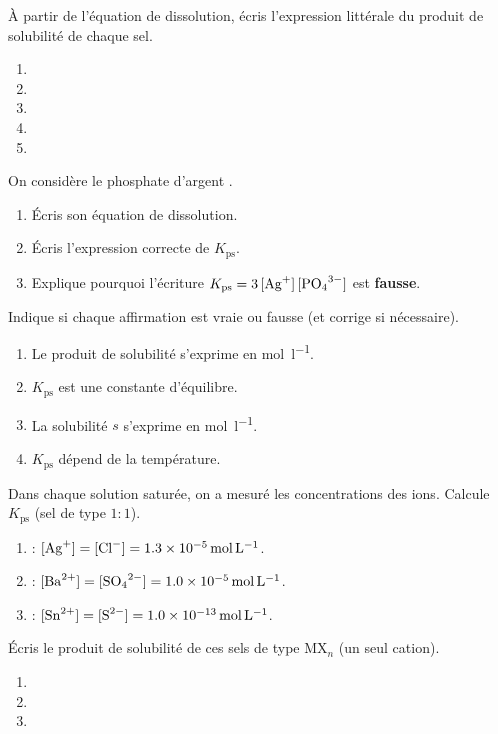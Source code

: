 \documentclass[11pt,a4paper]{article}
\begin{document}
\begin{exo}
À partir de l'équation de dissolution, écris l'expression littérale du produit de solubilité de chaque
sel.
\begin{enumerate}[label=\alph*)]
  \item {}
  \item {}
  \item {}
  \item {}
  \item {}
\end{enumerate}
\end{exo}

\begin{exo}
On considère le phosphate d'argent .
\begin{enumerate}[label=\alph*)]
  \item Écris son équation de dissolution.
  \item Écris l'expression correcte de $K_{\mathrm{ps}}$.
  \item Explique pourquoi l'écriture $K_{\mathrm{ps}} = 3\,[\ce{Ag+}]\,[\ce{PO4^{3-}}]$ est
        \textbf{fausse}.
\end{enumerate}
\end{exo}

\begin{exo}
Indique si chaque affirmation est vraie ou fausse (et corrige si nécessaire).
\begin{enumerate}[label=\alph*)]
  \item Le produit de solubilité s'exprime en \si{\mole\per\litre}.
  \item $K_{\mathrm{ps}}$ est une constante d'équilibre.
  \item La solubilité $s$ s'exprime en \si{\mole\per\litre}.
  \item $K_{\mathrm{ps}}$ dépend de la température.
\end{enumerate}
\end{exo}

\begin{exo}
Dans chaque solution saturée, on a mesuré les concentrations des ions. Calcule $K_{\mathrm{ps}}$
(sel de type $1{:}1$).
\begin{enumerate}[label=\alph*)]
  \item {} : $[\ce{Ag+}]=[\ce{Cl-}]=\qty{1.3e-5}{\mole\per\litre}$.
  \item {} : $[\ce{Ba^{2+}}]=[\ce{SO4^{2-}}]=\qty{1.0e-5}{\mole\per\litre}$.
  \item {} : $[\ce{Sn^{2+}}]=[\ce{S^{2-}}]=\qty{1.0e-13}{\mole\per\litre}$.
\end{enumerate}
\end{exo}

\begin{exo}
Écris le produit de solubilité de ces sels de type $\mathrm{MX}_n$ (un seul cation).
\begin{enumerate}[label=\alph*)]
  \item {}
  \item {}
  \item {}
\end{enumerate}
\end{exo}
\end{document}

